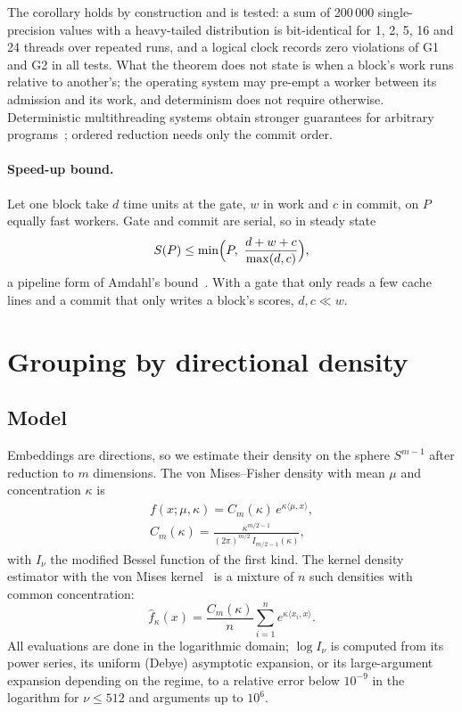 \documentclass[10pt,twocolumn]{article}
\theoremstyle{definition}
\theoremstyle{remark}
\begin{document}
The corollary holds by construction and is tested: a sum of 200\,000 single-precision values with a heavy-tailed distribution is bit-identical for 1, 2, 5, 16 and 24 threads over repeated runs, and a logical clock records zero violations of G1 and G2 in all tests.
What the theorem does not state is when a block's work runs relative to another's; the operating system may pre-empt a worker between its admission and its work, and determinism does not require otherwise.
Deterministic multithreading systems obtain stronger guarantees for arbitrary programs~\cite{olszewski2009kendo,bergan2010coredet,liu2011dthreads}; ordered reduction needs only the commit order.

\paragraph{Speed-up bound.}
Let one block take $d$ time units at the gate, $w$ in work and $c$ in commit, on $P$ equally fast workers.
Gate and commit are serial, so in steady state
\begin{equation}
S(P)\le \min\Bigl(P,\ \frac{d+w+c}{\max(d,c)}\Bigr),
\end{equation}
a pipeline form of Amdahl's bound~\cite{amdahl1967validity,hill2008amdahl}.
With a gate that only reads a few cache lines and a commit that only writes a block's scores, $d,c\ll w$.

\section{Grouping by directional density}\label{sec:kde}

\subsection{Model}
Embeddings are directions, so we estimate their density on the sphere $S^{m-1}$ after reduction to $m$ dimensions.
The von Mises--Fisher density with mean $\mu$ and concentration $\kappa$ is~\cite{banerjee2005}
\begin{gather}
f(x;\mu,\kappa)=C_m(\kappa)\,e^{\kappa\langle\mu,x\rangle},\\
C_m(\kappa)=\frac{\kappa^{m/2-1}}{(2\pi)^{m/2}\,I_{m/2-1}(\kappa)},
\end{gather}
with $I_\nu$ the modified Bessel function of the first kind.
The kernel density estimator with the von Mises kernel~\cite{hall1987,bai1988} is a mixture of $n$ such densities with common concentration:
\begin{equation}\label{eq:kde}
\hat f_\kappa(x)=\frac{C_m(\kappa)}{n}\sum_{i=1}^n e^{\kappa\langle x_i,x\rangle}.
\end{equation}
All evaluations are done in the logarithmic domain; $\log I_\nu$ is computed from its power series, its uniform (Debye) asymptotic expansion, or its large-argument expansion depending on the regime, to a relative error below $10^{-9}$ in the logarithm for $\nu\le 512$ and arguments up to $10^6$.
\end{document}
